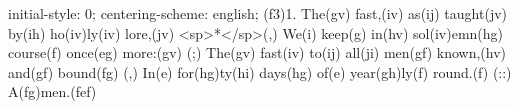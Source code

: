 initial-style: 0;
centering-scheme: english;
(f3)1. The(gv) fast,(iv) as(ij) taught(jv) by(ih) ho(iv)ly(iv) lore,(jv) <sp>*</sp>(,)
We(i) keep(g) in(hv) sol(iv)emn(hg) course(f) once(eg) more:(gv) (;)
The(gv) fast(iv) to(ij) all(ji) men(gf) known,(hv) and(gf) bound(fg) (,)
In(e) for(hg)ty(hi) days(hg) of(e) year(gh)ly(f) round.(f)
(::) A(fg)men.(fef)